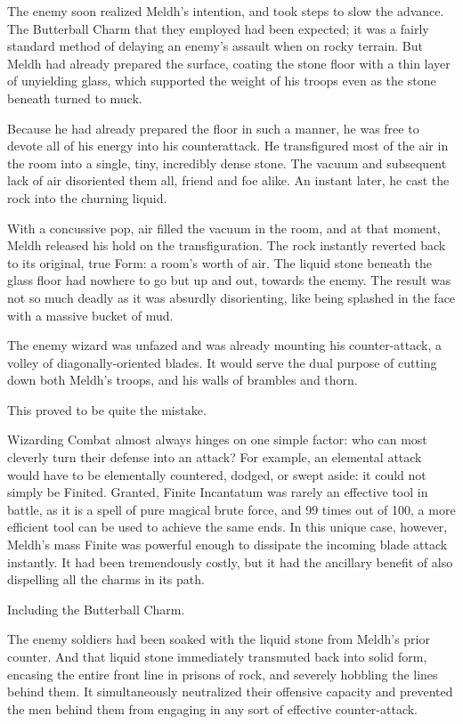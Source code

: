 The enemy soon realized Meldh’s intention, and took steps to slow the advance. The Butterball Charm that they employed had been expected; it was a fairly standard method of delaying an enemy’s assault when on rocky terrain. But Meldh had already prepared the surface, coating the stone floor with a thin layer of unyielding glass, which supported the weight of his troops even as the stone beneath turned to muck.

Because he had already prepared the floor in such a manner, he was free to devote all of his energy into his counterattack. He transfigured most of the air in the room into a single, tiny, incredibly dense stone. The vacuum and subsequent lack of air disoriented them all, friend and foe alike. An instant later, he cast the rock into the churning liquid.

With a concussive pop, air filled the vacuum in the room, and at that moment, Meldh released his hold on the transfiguration. The rock instantly reverted back to its original, true Form: a room’s worth of air. The liquid stone beneath the glass floor had nowhere to go but up and out, towards the enemy. The result was not so much deadly as it was absurdly disorienting, like being splashed in the face with a massive bucket of mud.

The enemy wizard was unfazed and was already mounting his counter-attack, a volley of diagonally-oriented blades. It would serve the dual purpose of cutting down both Meldh’s troops, and his walls of brambles and thorn.

This proved to be quite the mistake.

Wizarding Combat almost always hinges on one simple factor: who can most cleverly turn their defense into an attack? For example, an elemental attack would have to be elementally countered, dodged, or swept aside: it could not simply be Finited. Granted, Finite Incantatum was rarely an effective tool in battle, as it is a spell of pure magical brute force, and 99 times out of 100, a more efficient tool can be used to achieve the same ends. In this unique case, however, Meldh’s mass Finite was powerful enough to dissipate the incoming blade attack instantly. It had been tremendously costly, but it had the ancillary benefit of also dispelling all the charms in its path.

Including the Butterball Charm.

The enemy soldiers had been soaked with the liquid stone from Meldh’s prior counter. And that liquid stone immediately transmuted back into solid form, encasing the entire front line in prisons of rock, and severely hobbling the lines behind them. It simultaneously neutralized their offensive capacity and prevented the men behind them from engaging in any sort of effective counter-attack.

